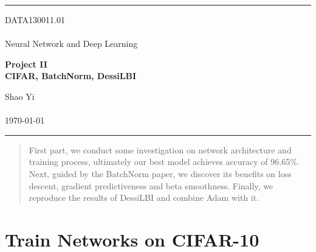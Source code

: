 \documentclass[a4paper, 11pt]{article} %
\begin{document}

\fancyhead[C]{}
\hrule \medskip %
\begin{minipage}{0.295\textwidth} %
	\raggedright
	DATA130011.01\\ %
	\footnotesize %
	\hfill\\
	Neural Network and Deep Learning\\ %
\end{minipage}
\begin{minipage}{0.4\textwidth} %
	\centering
	\large %
	\textbf{Project II}\\ %
	\normalsize %
	\textbf{CIFAR, BatchNorm, DessiLBI}\\ %
\end{minipage}
\begin{minipage}{0.295\textwidth} %
	\raggedleft
	Shao Yi\\ %
	\footnotesize %
	\hfill\\
	\today\\ %
\end{minipage}
\medskip\hrule %
\bigskip


\begin{abstract}
	First part, we conduct some investigation on network architecture and training process,
	ultimately our best model achieves accuracy of 96.65\%. Next, guided by the BatchNorm
	paper, we discover its benefits on loss descent, gradient predictiveness and beta
	smoothness. Finally, we reproduce the results of DessiLBI and combine Adam with it.
\end{abstract}

\bigskip


\section{\textbf{Train Networks on CIFAR-10}}
\end{document}
